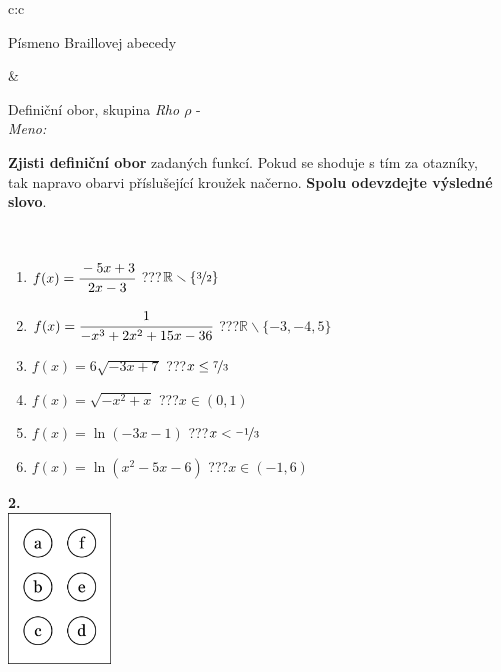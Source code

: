\documentclass[10pt]{report}
\begin{document}
\begin{tabular}{c:c}
\begin{minipage}[c][104.5mm][t]{0.5\linewidth}
\begin{center}
\begin{minipage}{0.20\linewidth}
\begin{center}
{\small Písmeno Braillovej abecedy}
\end{center}
\end{minipage}
\end{center}
\end{minipage}
&
\begin{minipage}[c][104.5mm][t]{0.5\linewidth}
\begin{center}
\vspace{7mm}
{\huge Definiční obor, skupina \textit{Rho $\rho$} -}\\[5mm]
\textit{Meno:}\phantom{xxxxxxxxxxxxxxxxxxxxxxxxxxxxxxxxxxxxxxxxxxxxxxxxxxxxxxxxxxxxxxxxx}\\[5mm]
\begin{minipage}{0.95\linewidth}
\textbf{Zjisti definiční obor} zadaných funkcí. Pokud se shoduje s tím za otazníky,\\tak napravo obarvi příslušející kroužek načerno. \textbf{Spolu odevzdejte výsledné slovo}.
\end{minipage}
\\[1mm]
\begin{minipage}{0.79\linewidth}
\begin{center}
\begin{varwidth}{\linewidth}
\begin{enumerate}
\normalsizerrr
\item $f(x)=\cfrac{-5x+3}{2x-3}$\quad \dotfill\; ???\;\dotfill \quad $\mathbb{R}\smallsetminus\{\nicefrac{3}{2}\}$
\item $f(x)=\cfrac{1}{-x^3+2x^2+15x-36}$\quad \dotfill\; ???\;\dotfill \quad $\mathbb{R}\smallsetminus\{-3,-4,5\}$
\item $f(x)=6\sqrt{-3x+7}$\quad \dotfill\; ???\;\dotfill \quad $x\leq\nicefrac{7}{3}$
\item $f(x)=\sqrt{-x^2+x}$\quad \dotfill\; ???\;\dotfill \quad $x\in(0 , 1)$
\item $f(x)=\ln{(-3x-1)}$\quad \dotfill\; ???\;\dotfill \quad $x<\nicefrac{-1}{3}$
\item $f(x)=\ln{(x^2-5x-6)}$\quad \dotfill\; ???\;\dotfill \quad $x\in(-1 , 6)$
\end{enumerate}
\end{varwidth}
\end{center}
\end{minipage}
\begin{minipage}{0.20\linewidth}
\begin{center}
{\Huge\bfseries 2.} \\[2mm]
\includegraphics[height=40mm]{../images/braille.png}

\end{center}
\end{minipage}
\end{center}
\end{minipage}
\end{tabular}
\end{document}
